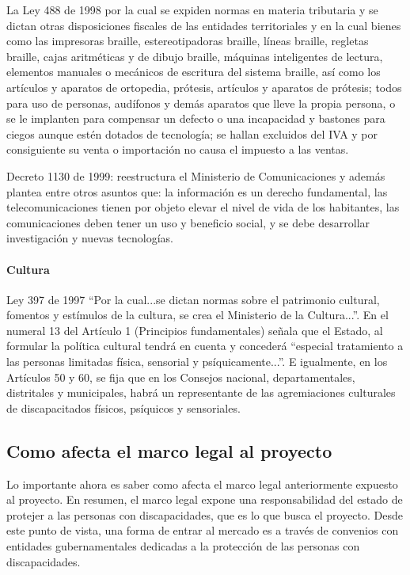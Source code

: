 \documentclass[a4paper, 12pt, oneside]{article}
\begin{document}
	La Ley 488 de 1998 por la cual se expiden normas en materia tributaria y se dictan otras disposiciones fiscales de las entidades territoriales y en la cual bienes como las impresoras braille, estereotipadoras braille, líneas braille, regletas braille, cajas aritméticas y de dibujo braille, máquinas inteligentes de lectura, elementos manuales o mecánicos de escritura del sistema braille, así como los artículos y aparatos de ortopedia, prótesis, artículos y aparatos de prótesis; todos para uso de personas, audífonos y demás aparatos que lleve la propia persona, o se le implanten para compensar un defecto o una incapacidad y bastones para ciegos aunque estén dotados de tecnología; se hallan excluidos del IVA y por consiguiente su venta o importación no causa el impuesto a las ventas. 

	Decreto 1130 de 1999: reestructura el Ministerio de Comunicaciones y además plantea entre otros asuntos que: la información es un derecho fundamental, las telecomunicaciones tienen por objeto elevar el nivel de vida de los habitantes, las comunicaciones deben tener un uso y beneficio social, y se debe desarrollar investigación y nuevas tecnologías.

	\paragraph{Cultura}

	Ley 397 de 1997 “Por la cual...se dictan normas sobre el patrimonio cultural, fomentos y estímulos de la cultura, se crea el Ministerio de la Cultura...”. En el numeral 13 del Artículo 1 (Principios fundamentales) señala que el Estado, al formular la política cultural tendrá en cuenta y concederá “especial tratamiento a las personas limitadas física, sensorial y psíquicamente...”. E igualmente, en los Artículos 50 y 60, se fija que en los Consejos nacional, departamentales, distritales y municipales, habrá un representante de las agremiaciones culturales de discapacitados físicos, psíquicos y sensoriales.	
	
	\subsection{Como afecta el marco legal al proyecto}
	Lo importante ahora es saber como afecta el marco legal anteriormente expuesto al proyecto. En resumen, el marco legal expone una responsabilidad del estado de protejer a las personas con discapacidades, que es lo que busca el proyecto. Desde este punto de vista, una forma de entrar al mercado es a través de convenios con entidades gubernamentales dedicadas a la protección de las personas con discapacidades.
	
\end{document}
